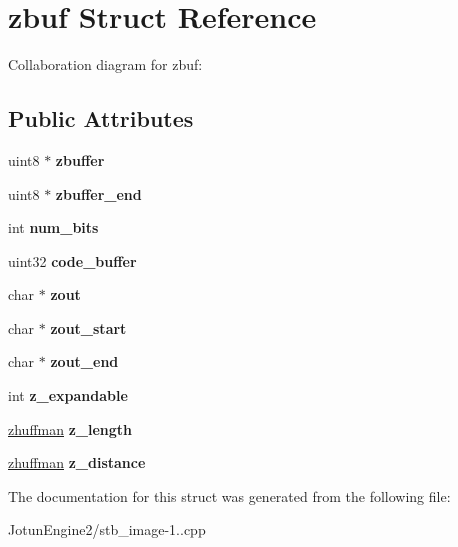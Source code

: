 \hypertarget{structzbuf}{\section{zbuf Struct Reference}
\label{structzbuf}
}


Collaboration diagram for zbuf\-:
\subsection*{Public Attributes}
\begin{DoxyCompactItemize}
\item 
\hypertarget{structzbuf_a7080eb91dcc67e1dfe818d08e6f22c4e}{uint8 $\ast$ {\bfseries zbuffer}}\label{structzbuf_a7080eb91dcc67e1dfe818d08e6f22c4e}

\item 
\hypertarget{structzbuf_af030baa17bebedd18272678da17a33f4}{uint8 $\ast$ {\bfseries zbuffer\-\_\-end}}\label{structzbuf_af030baa17bebedd18272678da17a33f4}

\item 
\hypertarget{structzbuf_acd069cdb4100884a732ad2794edbbdff}{int {\bfseries num\-\_\-bits}}\label{structzbuf_acd069cdb4100884a732ad2794edbbdff}

\item 
\hypertarget{structzbuf_a3bb8244d7be17801079c5a8587182edb}{uint32 {\bfseries code\-\_\-buffer}}\label{structzbuf_a3bb8244d7be17801079c5a8587182edb}

\item 
\hypertarget{structzbuf_aaf137c25fa5b9fb14e92354da4203c38}{char $\ast$ {\bfseries zout}}\label{structzbuf_aaf137c25fa5b9fb14e92354da4203c38}

\item 
\hypertarget{structzbuf_af31571e8d74c78c9bb18d92205150b28}{char $\ast$ {\bfseries zout\-\_\-start}}\label{structzbuf_af31571e8d74c78c9bb18d92205150b28}

\item 
\hypertarget{structzbuf_af07c0b7b7227f670ee1413bc0dcab791}{char $\ast$ {\bfseries zout\-\_\-end}}\label{structzbuf_af07c0b7b7227f670ee1413bc0dcab791}

\item 
\hypertarget{structzbuf_ae662f24e0973ca19b543e64647a6bfb6}{int {\bfseries z\-\_\-expandable}}\label{structzbuf_ae662f24e0973ca19b543e64647a6bfb6}

\item 
\hypertarget{structzbuf_a5906bdbe9dfb565339acac51af9efe89}{\hyperlink{structzhuffman}{zhuffman} {\bfseries z\-\_\-length}}\label{structzbuf_a5906bdbe9dfb565339acac51af9efe89}

\item 
\hypertarget{structzbuf_ae7d9588b2548708e14f3c6ad89bf26b5}{\hyperlink{structzhuffman}{zhuffman} {\bfseries z\-\_\-distance}}\label{structzbuf_ae7d9588b2548708e14f3c6ad89bf26b5}

\end{DoxyCompactItemize}


The documentation for this struct was generated from the following file\-:\begin{DoxyCompactItemize}
\item 
Jotun\-Engine2/stb\-\_\-image-\/1..\-cpp\end{DoxyCompactItemize}
